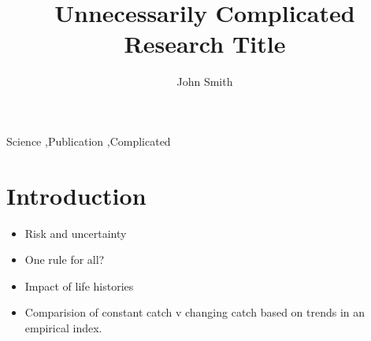 \documentclass[preprint,12pt]{elsarticle}
\begin{document}
\begin{frontmatter}


\title{Unnecessarily Complicated Research Title}




\author{John Smith}

\address{California, United States}

\begin{abstract}

\end{abstract}

\begin{keyword}
Science \sep Publication \sep Complicated


\end{keyword}

\end{frontmatter}

\linenumbers

\section{Introduction}
\label{S:1}

\begin{itemize}
\item Risk and uncertainty
\item One rule for all?
\item Impact of life histories
\item Comparision of constant catch v changing catch based on trends in an empirical index. 
\end{itemize}
\end{document}
